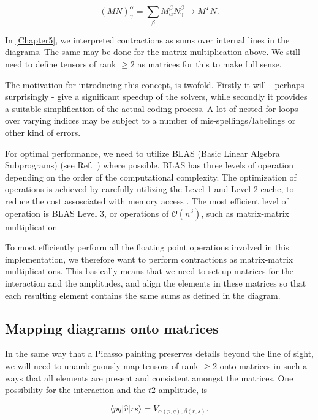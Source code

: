 \begin{equation}
(MN)^\alpha_\gamma = \sum_\beta M^\beta_\alpha N^\beta_\gamma \rightarrow  M^T N.
\end{equation}

In \ref{Chapter5}, we interpreted contractions as sums over internal lines in the diagrams. The same may be done for the matrix multiplication above. We still need to define tensors of rank $\geq 2$ as matrices for this to make full sense.

The motivation for introducing this concept, is twofold. Firstly it will - perhaps surprisingly - give a significant speedup of the solvers, while secondly it provides a suitable simplification of the actual coding process. A lot of nested for loops over varying indices may be subject to a number of mis-spellings/labelings or other kind of errors.  

For optimal performance, we need to utilize BLAS (Basic Linear Algebra Subprograms) (see Ref.~\cite{BLASsite}) where possible. BLAS has three levels of operation depending on the order of the computational complexity. The optimization of operations is achieved by carefully utilizing the Level 1 and Level 2 cache, to reduce the cost assosciated with memory access \cite{Karniadakis}. The most efficient level of operation is BLAS Level 3, or operations of $\mathcal{O} (n^3)$, such as matrix-matrix multiplication \cite{Karniadakis}

To most efficiently perform all the floating point operations involved in this implementation, we therefore want to perform contractions as matrix-matrix multiplications. This basically means that we need to set up matrices for the interaction and the amplitudes, and align the elements in these matrices so that each resulting element contains the same sums as defined in the diagram.

\subsection{Mapping diagrams onto matrices}

In the same way that a Picasso painting preserves details beyond the line of sight, we will need to unambiguously map tensors of rank $\geq 2$ onto matrices in such a ways that all elements are present and consistent amongst the matrices. One possibility for the interaction and the $t2$ amplitude, is

\begin{equation}
\langle p q \vert \hat{v}\vert r s \rangle = V_{\alpha(p,q), \beta(r,s)}.
\label{eqn:t2mapping}
\end{equation}

